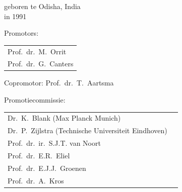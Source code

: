 \begin{titlepage}
\begin{center}
\bigskip
\bigskip


geboren te Odisha, India \\
in 1991

\vspace*{2\bigskipamount}

\end{center}

\clearpage
\thispagestyle{empty}

\noindent Promotors:

\medskip\noindent
\begin{tabular}{l}
    Prof.\ dr.\ M.\ Orrit \\
    Prof.\ dr.\ G.\ Canters
\end{tabular}

\medskip
\noindent Copromotor: Prof.\ dr.\ T.\ Aartsma

\medskip
\noindent Promotiecommissie:

\medskip\noindent
\begin{tabular}{ll}
    Dr.\ K.\ Blank (Max Planck Munich) \\
    Dr.\ P.\ Zijlstra (Technische Universiteit Eindhoven) \\
    Prof.\ dr.\ ir.\ S.J.T. van Noort \\
    Prof.\ dr.\ E.R.\ Eliel \\
    Prof.\ dr.\ E.J.J.\ Groenen \\
    Prof.\ dr.\ A.\ Kros \\
\end{tabular}



\end{titlepage}
